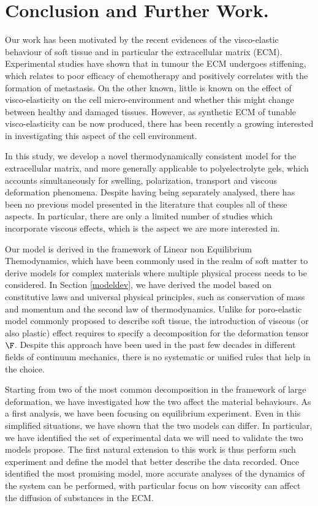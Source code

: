 \section{Conclusion and Further Work.}

Our work has been motivated by the recent evidences of the visco-elastic behaviour of soft tissue and in particular the extracellular matrix (ECM). Experimental studies have shown that in tumour the ECM undergoes stiffening, which relates to poor efficacy of chemotherapy and positively correlates with the formation of metastasis. On the other known, little is known on the effect of visco-elasticity on the cell micro-environment and whether this might change between healthy and damaged tissues. However, as synthetic ECM of tunable visco-elasticity can be now produced, there has been recently a growing interested in investigating this aspect of the cell environment.

In this study, we develop a novel thermodynamically consistent model for the extracellular matrix, and more generally applicable to polyelectrolyte gels, which accounts simultaneously for swelling, polarization, transport and viscous deformation phenomena. Despite having being separately analysed, there has been no previous model presented in the literature that couples all of these aspects. In particular, there are only a limited number of studies which incorporate viscous effects, which is the aspect we are more interested in. 

Our model is derived in the framework of Linear non Equilibrium Themodynamics, which have been commonly used in the realm of soft matter to derive models for complex materials where multiple physical process needs to be considered. In Section \ref{modeldev}, we have derived the model based on constitutive laws and universal physical principles, such as conservation of mass and momentum and the second law of thermodynamics. Unlike for poro-elastic model commonly proposed to describe soft tissue, the introduction of viscous (or also plastic) effect requires to specify a decomposition for the deformation tensor $\F$. Despite this approach have been used in the past few decades in different fields of continuum mechanics, there is no systematic or unified rules that help in the choice. 

Starting from two of the most common decomposition in the framework of large deformation, we have investigated how the two affect the material behaviours. As a first analysis, we have been focusing on equilibrium experiment. Even in this simplified situations, we have shown that the two models can differ. In particular, we have identified the set of experimental data we will need to validate the two models propose. The first natural extension to this work is thus perform such experiment and define the model that better describe the data recorded. Once identified the most promising model, more accurate analyses of the dynamics of the system can be performed, with particular focus on how viscosity can affect the diffusion of substances in the ECM. 